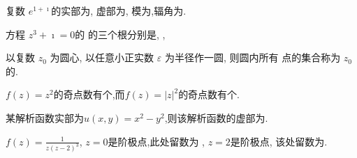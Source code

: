 \documentclass{njustexam}
\begin{document}
\renewcommand{\course}{数学物理方法}                          %
\renewcommand{\duration}{100}                                            %
\renewcommand{\credit}{5}                                                   %
\renewcommand{\syllabus}{}                               %
\renewcommand{\fullmark}{100}                                            %
\renewcommand{\composer}{罗凯}            %
\renewcommand{\composedate}{2023年12月01日}                   %
\renewcommand{\validator}{}                                        %
\renewcommand{\coursetype}{1}                                            %
\renewcommand{\exammethod}{1}                                         %
\renewcommand{\testpaper}{A}                                              %

\makehead %


\begin{problem}
 复数 $e^{1+\imath}$的实部为, 虚部为, 
 模为,辐角为.
\end{problem}


\begin{problem}
方程 $z^3 + \imath = 0$的
的三个根分别是\fillout{$\imath$},
,
\end{problem}


\begin{problem}
  以复数 $z_0$ 为圆心, 以任意小正实数 $\varepsilon$ 为半径作一圆, 则圆内所有 点的集合称为 $z_0$ 的.
\end{problem}


\begin{problem}
$f(z)=z^2$的奇点数有个,而$f(z)=|z|^2$的奇点数有个.
\end{problem}


\begin{problem}
某解析函数实部为$u(x,y) = x^2 - y^2$,则该解析函数的虚部为.
\end{problem}


\begin{problem}
 $ f(z) = \frac{1}{z( z- 2)^3}$, $z=0$是阶极点,此处留数为 ,
 $z=2$是阶极点, 该处留数为.
\end{problem}
\end{document}
